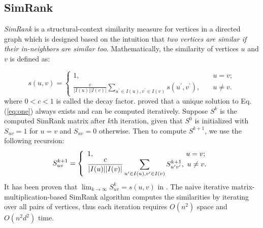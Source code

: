 \documentclass[conference]{IEEEtran}
\theoremstyle{definition}
\theoremstyle{definition}
\begin{document}
\subsection{SimRank}
{\em SimRank} \cite{jeh2002simrank} is a structural-context similarity measure for vertices in a directed graph which is designed based on the intuition that {\em two vertices are similar if their in-neighbors are similar too}.  Mathematically, the similarity of vertices $u$ and $v$ is defined as:
\iffalse
\begin{equation}
s(u, v)=\begin{cases} 
1, & \quad u = v ; \\
\frac{c}{|I(u)||I(v)|}\sum\limits_{u^\prime \in I(u), v^\prime \in I(v)} s(u^\prime, v^\prime), & \quad u \ne v.
\end{cases}
\end{equation}
\fi
\begin{equation}
s(u, v) = \left\{
        \begin{array}{ll}
	1, & \quad u = v ; \\
	\displaystyle\frac{c}{|I(u)||I(v)|}\displaystyle\sum_{u^\prime \in I(u), v^\prime \in I(v)} s(u^\prime, v^\prime), & \quad u \ne v.
        \end{array}
    \right.
	\label{eq:one}
\end{equation}
where $0 < c < 1$ is called the decay factor.
 \cite{jeh2002simrank} proved that a unique solution to Eq. (\ref{eq:one}) always exists and  can be computed iteratively. 
Suppose $S^k$ is the computed SimRank matrix after $k$th iteration, given that $S^0$ is  initialized with $S_{uv} = 1$ for $u = v$ and $S_{uv} = 0$ otherwise. 
Then to compute $S^{k+1}$, we use the following recursion:
\begin{equation}
S^{k+1}_{uv} = \left\{
        \begin{array}{ll}
	1, &\hspace{-0.5em}  \! u = v ; \\
	\displaystyle\frac{c}{|I(u)||I(v)|}\displaystyle\sum_{u^\prime \in I(u), v^\prime \in I(v)} S^{k+1}_{u^\prime v^\prime} , & \hspace{-0.5em} u \ne v.
        \end{array}
    \right.
	\label{eq:two}
\end{equation}
It has been proven that $\lim_{k\to\infty}S^k_{uv} = s(u,v)$ in  \cite{jeh2002simrank}.
The naive iterative matrix-multiplication-based SimRank algorithm computes the similarities 
by iterating over all pairs of vertices, thus each iteration requires $O(n^2)$ space and $O(n^2d^2)$ time.
\end{document}
